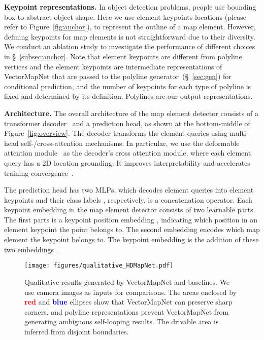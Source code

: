 \documentclass{article}
\theoremstyle{plain}
\theoremstyle{definition}
\theoremstyle{remark}
\begin{document}
\noindent\textbf{Keypoint representations.} 
In object detection problems, people use bounding box to abstract object shape. Here we use  element keypoints locations  (please refer to Figure~\ref{fig:anchor}), to represent the outline of a map element. However, defining keypoints for map elements is not straightforward due to their diversity. We conduct an ablation study to investigate the performance of different choices in \S~\ref{subsec:anchor}. 
Note that element keypoints are different from polyline vertices and the element keypoints are intermediate representations of VectorMapNet that are passed to the polyline generator~(\S~\ref{sec:gen}) for conditional prediction, and the number of keypoints for each type of polyline is fixed and determined by its definition. Polylines are our output representations.


\noindent\textbf{Architecture.}
The overall architecture of the map element detector consists of a transformer decoder~\citep{vaswani2017attention} and a prediction head, as shown at the bottom-middle of Figure~\ref{fig:overview}. 
The decoder transforms the element queries using multi-head self-/cross-attention mechanisms. 
In particular, we use the deformable attention module~\citep{zhu2020deformable} as the decoder's cross attention module, where each element query has a 2D location grounding. It improves interpretability and accelerates training convergence~\citep{li2022dn}.

The prediction head has two MLPs, which decodes element queries into element keypoints  and their class labels , respectively.  is a concatenation operator.
Each keypoint embedding  in the map element detector consists of two learnable parts.
The first parts is a keypoint position embedding , indicating which position in an element keypoint the point belongs to. The second embedding  encodes which map element the keypoint belongs to. The keypoint embedding  is the addition of these two embeddings .

\begin{figure*}[htp]
    \centering
    \texttt{[image: figures/qualitative\_HDMapNet.pdf]}
    \vspace{-1em}
    \caption{
    Qualitative results generated by VectorMapNet and baselines. We use camera images as inputs for comparisons. The areas enclosed by \textbf{\textcolor{red}{red}} and \textbf{\textcolor{blue}{blue}} ellipses show that VectorMapNet can preserve sharp corners, and polyline representations prevent VectorMapNet from generating ambiguous self-looping results. The drivable area is inferred from disjoint boundaries. }
    \label{fig:qualitative_HDMapNet} 
    \vspace{-1.em}

\end{figure*}
\end{document}
